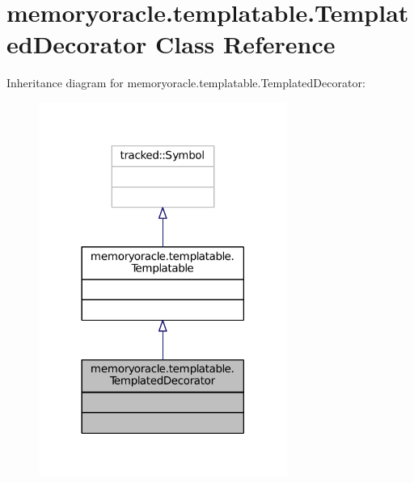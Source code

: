 \hypertarget{classmemoryoracle_1_1templatable_1_1TemplatedDecorator}{}\section{memoryoracle.\+templatable.\+Templated\+Decorator Class Reference}
\label{classmemoryoracle_1_1templatable_1_1TemplatedDecorator}


Inheritance diagram for memoryoracle.\+templatable.\+Templated\+Decorator\+:\nopagebreak
\begin{figure}[H]
\begin{center}
\leavevmode
\includegraphics[width=230pt]{classmemoryoracle_1_1templatable_1_1TemplatedDecorator__inherit__graph}
\end{center}
\end{figure}


